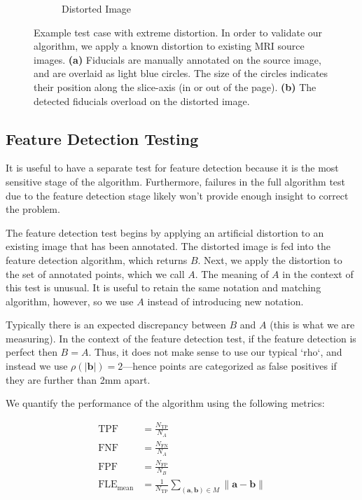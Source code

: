 \documentclass[12pt]{article}
\begin{document}
\begin{figure}
\begin{subfigure}[b]{0.48\textwidth}
        \caption{Distorted Image}
        \label{fig:test-case_2}
    \end{subfigure}
    \caption{Example test case with extreme distortion.  In order to validate our algorithm, we apply a known distortion to existing MRI source images. \textbf{(a)} Fiducials are manually annotated on the source image, and are overlaid as light blue circles.  The size of the circles indicates their position along the slice-axis (in or out of the page).  \textbf{(b)} The detected fiducials overload on the distorted image.}
    \label{fig:test-case}
\end{figure}

\subsection{Feature Detection Testing}

It is useful to have a separate test for feature detection because it is the most sensitive stage of the algorithm.  Furthermore, failures in the full algorithm test due to the feature detection stage likely won't provide enough insight to correct the problem.

The feature detection test begins by applying an artificial distortion to an existing image that has been annotated.  The distorted image is fed into the feature detection algorithm, which returns $B$.  Next, we apply the distortion to the set of annotated points, which we call $A$.  The meaning of $A$ in the context of this test is unusual.  It is useful to retain the same notation and matching algorithm, however, so we use $A$ instead of introducing new notation.

Typically there is an expected discrepancy between $B$ and $A$ (this is what we are measuring).  In the context of the feature detection test, if the feature detection is perfect then $B = A$.  Thus, it does not make sense to use our typical `rho`, and instead we use $\rho(|\mathbf{b}|) = 2$---hence points are categorized as false positives if they are further than 2mm apart.  

We quantify the performance of the algorithm using the following metrics: 

\begin{align*}
    \textrm{TPF} &= \frac{N_\textrm{TP}}{N_A} \\
    \textrm{FNF} &= \frac{N_\textrm{FN}}{N_A} \\
    \textrm{FPF} &= \frac{N_\textrm{FP}}{N_B} \\
    \textrm{FLE}_\textrm{mean} &= \frac{1}{N_\textrm{TP}} \sum_{(\textbf{a}, \textbf{b}) \in M} \| \textbf{a} - \textbf{b} \|\\
\end{align*}
\end{document}

